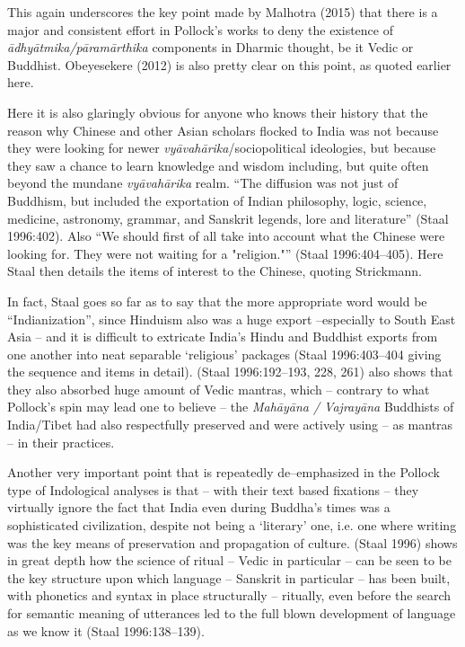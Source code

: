 This again underscores the key point made by Malhotra (2015) that there is a major and consistent effort in Pollock’s works to deny the existence of \textit{ādhyātmika/pāramārthika} components in Dharmic thought, be it Vedic or Buddhist. Obeyesekere (2012) is also pretty clear on this point, as quoted earlier here.

Here it is also glaringly obvious for anyone who knows their history that the reason why Chinese and other Asian scholars flocked to India was not because they were looking for newer \textit{vyāvahārika}/sociopolitical ideologies, but because they saw a chance to learn knowledge and wisdom including, but quite often beyond the mundane \textit{vyāvahārika} realm. “The diffusion was not just of Buddhism, but included the exportation of Indian philosophy, logic, science, medicine, astronomy, grammar, and Sanskrit legends, lore and literature” (Staal 1996:402). Also “We should first of all take into account what the Chinese were looking for. They were not waiting for a "religion."” (Staal 1996:404–405). Here Staal then details the items of interest to the Chinese, quoting Strickmann.

In fact, Staal goes so far as to say that the more appropriate word would be “Indianization”, since Hinduism also was a huge export –especially to South East Asia – and it is difficult to extricate India’s Hindu and Buddhist exports from one another into neat separable ‘religious’ packages (Staal 1996:403–404 giving the sequence and items in detail). (Staal 1996:192–193, 228, 261) also shows that they also absorbed huge amount of Vedic mantras, which – contrary to what Pollock’s spin may lead one to believe – the \textit{Mahāyāna / Vajrayāna} Buddhists of India/Tibet had also respectfully preserved and were actively using – as mantras – in their practices.

Another very important point that is repeatedly de–emphasized in the Pollock type of Indological analyses is that – with their text based fixations – they virtually ignore the fact that India even during Buddha’s times was a sophisticated civilization, despite not being a ‘literary’ one, i.e. one where writing was the key means of preservation and propagation of culture. (Staal 1996) shows in great depth how the science of ritual – Vedic in particular – can be seen to be the key structure upon which language – Sanskrit in particular – has been built, with phonetics and syntax in place structurally – ritually, even before the search for semantic meaning of utterances led to the full blown development of language as we know it (Staal 1996:138–139).

